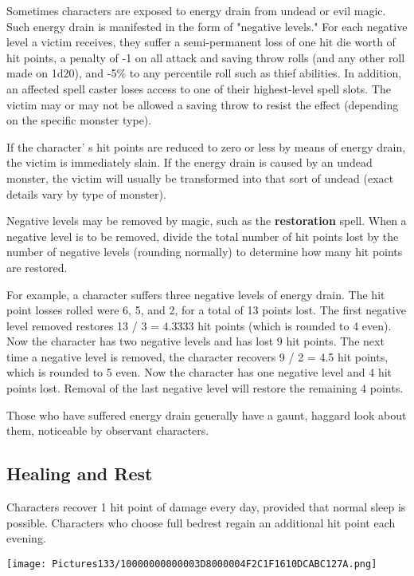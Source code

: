\documentclass[a4paper,twoside,openany,10pt]{book}
\begin{document}
\begin{multicols}{2}
Sometimes characters are exposed to energy drain from undead or evil magic. Such energy drain is manifested in the form of "negative levels." For each negative level a victim receives, they suffer a semi-permanent loss of one hit die worth of hit points, a penalty of -1 on all attack and saving throw rolls (and any other roll made on 1d20), and -5\% to any percentile roll such as thief abilities. In addition, an affected spell caster loses access to one of their highest-level spell slots. The victim may or may not be allowed a saving throw to resist the effect (depending on the specific monster type).

If the character' s hit points are reduced to zero or less by means of energy drain, the victim is immediately slain. If the energy drain is caused by an undead monster, the victim will usually be transformed into that sort of undead (exact details vary by type of monster).

Negative levels may be removed by magic, such as the \textbf{restoration} spell. When a negative level is to be removed, divide the total number of hit points lost by the number of negative levels (rounding normally) to determine how many hit points are restored.

For example, a character suffers three negative levels of energy drain. The hit point losses rolled were 6, 5, and 2, for a total of 13 points lost. The first negative level removed restores 13 / 3 = 4.3333 hit points (which is rounded to 4 even). Now the character has two negative levels and has lost 9 hit points. The next time a negative level is removed, the character recovers 9 / 2 = 4.5 hit points, which is rounded to 5 even. Now the character has one negative level and 4 hit points lost. Removal of the last negative level will restore the remaining 4 points.

Those who have suffered energy drain generally have a gaunt, haggard look about them, noticeable by observant characters.

\subsection{Healing and Rest}\label{healing-and-rest}

Characters recover 1 hit point of damage every day, provided that normal sleep is possible. Characters who choose full bedrest regain an additional hit point each evening.

\begin{flushleft}
	\texttt{[image: Pictures133/10000000000003D8000004F2C1F1610DCABC127A.png]}
\end{flushleft}



\end{multicols}
\end{document}
